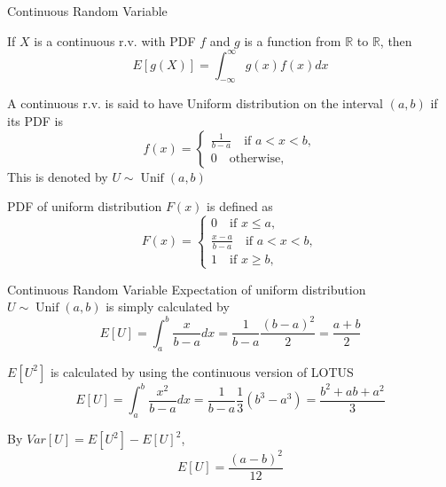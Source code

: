 \documentclass[8pt]{beamer}
\newcommand{\myunif}[2]{\operatorname{Unif}\!\left(#1, #2\right)}
\begin{document}
\begin{frame}{Continuous Random Variable}
    \begin{theorem}
        If $X$ is a continuous r.v. with PDF $f$ and $g$ is a function from $\mathbb{R}$ to $\mathbb{R}$, then
        \[
            E[g(X)] = \int_{-\infty}^\infty g(x)f(x) dx
        \]
    \end{theorem}

    \begin{definition}
        A continuous r.v. is said to have Uniform distribution on the interval $(a,b)$ if its PDF is
        \[
        f(x) = \begin{cases}
            \frac{1}{b-a}\quad \text{if } a<x<b, \\ 0 \quad \text{otherwise},
        \end{cases}
        \]
        This is denoted by $U \sim \myunif{a}{b} $
    \end{definition}

    PDF of uniform distribution $F(x)$ is defined as
    \[
        F(x) = \begin{cases}
            0 \quad \text{if } x\leq a,
            \\ \frac{x-a}{b-a} \quad \text{if } a < x <b,
            \\ 1 \quad \text{if } x \geq b,
        \end{cases}
    \]
\end{frame}

\begin{frame}{Continuous Random Variable}
    Expectation of uniform distribution $U \sim \myunif{a}{b}$ is simply calculated by 
    \[
    E[U] = \int_a^b \frac{x}{b-a} dx = \frac{1}{b-a} \frac{(b-a)^2}{2} = \frac{a+b}{2}
    \]

    $E[U^2]$ is calculated by using the continuous version of LOTUS
    \[
    E[U] = \int_a^b \frac{x^2}{b-a} dx = \frac{1}{b-a} \frac{1}{3}(b^3-a^3) = \frac{b^2 + ab + a^2}{3}
    \]

    By $Var[U] = E[U^2] - E[U]^2$,
    \[
        E[U] = \frac{(a-b)^2}{12}
    \]

\end{frame}
\end{document}
